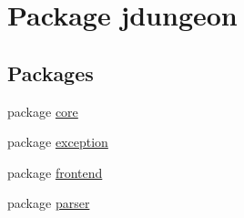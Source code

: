 \hypertarget{namespacejdungeon}{
\section{Package jdungeon}
\label{namespacejdungeon}
}
\subsection*{Packages}
\begin{DoxyCompactItemize}
\item 
package \hyperlink{namespacejdungeon_1_1core}{core}
\item 
package \hyperlink{namespacejdungeon_1_1exception}{exception}
\item 
package \hyperlink{namespacejdungeon_1_1frontend}{frontend}
\item 
package \hyperlink{namespacejdungeon_1_1parser}{parser}
\end{DoxyCompactItemize}
